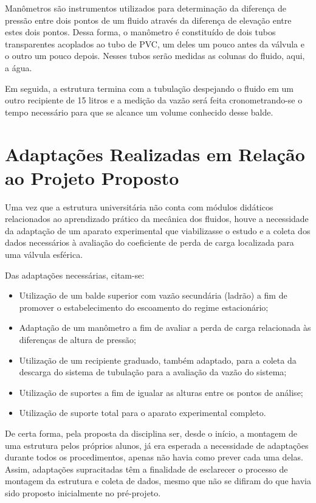 Manômetros são instrumentos utilizados para determinação da diferença de 
pressão entre dois pontos de um fluido através
da diferença de elevação entre estes dois pontos. Dessa forma, o manômetro 
é constituído de dois tubos transparentes
acoplados ao tubo de PVC, um deles um pouco antes da válvula e o outro um 
pouco depois. Nesses tubos serão medidas as colunas do fluido, aqui, a água.

Em seguida, a estrutura termina com a tubulação despejando o fluido em um 
outro recipiente de 15 litros e a medição da vazão será feita cronometrando-se o
tempo necessário para que se alcance um volume conhecido desse balde.

\section{Adaptações Realizadas em Relação ao Projeto Proposto}%
\label{sec:adaptacoes}

Uma vez que a estrutura universitária não conta com módulos didáticos
relacionados ao aprendizado prático da mecânica dos fluidos, houve a necessidade
da adaptação de um aparato experimental que viabilizasse o estudo e a coleta dos
dados necessários à avaliação do coeficiente de perda de carga localizada para
uma válvula esférica.

Das adaptações necessárias, citam-se:
\begin{itemize}
\item Utilização de um balde superior com vazão secundária (ladrão) a fim
  de promover o estabelecimento do escoamento do regime estacionário;
\item Adaptação de um manômetro a fim de avaliar a perda de carga relacionada às
  diferenças de altura de pressão;
\item Utilização de um recipiente graduado, também adaptado, para a coleta da
  descarga do sistema de tubulação para a avaliação da vazão do sistema;
\item Utilização de suportes a fim de igualar as alturas entre os pontos de
  análise;
\item Utilização de suporte total para o aparato experimental completo.
\end{itemize}

De certa forma, pela proposta da disciplina ser, desde o início, a montagem de
uma estrutura pelos próprios alunos, já era esperada a necessidade de adaptações
durante todos os procedimentos, apenas não havia como prever cada uma delas.
Assim, adaptações supracitadas têm a finalidade de esclarecer o processo de
montagem da estrutura e coleta de dados, mesmo que não se difiram do que havia
sido proposto inicialmente no pré-projeto.

